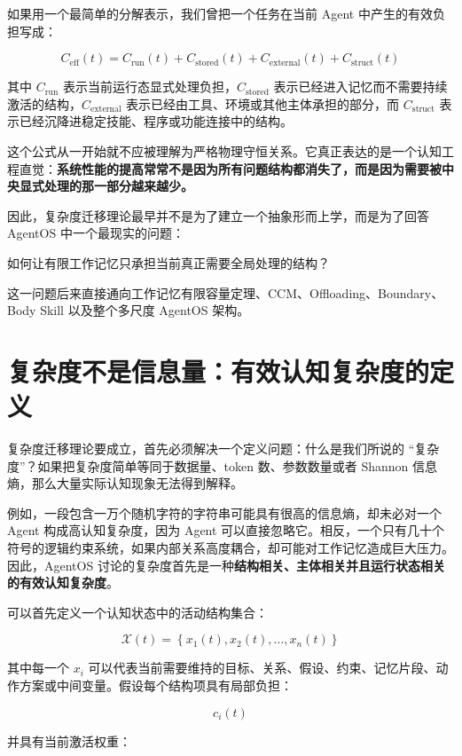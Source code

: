 如果用一个最简单的分解表示，我们曾把一个任务在当前 Agent 中产生的有效负担写成：

\[
C_{\mathrm{eff}}(t)
=
C_{\mathrm{run}}(t)
+
C_{\mathrm{stored}}(t)
+
C_{\mathrm{external}}(t)
+
C_{\mathrm{struct}}(t)
\]

其中 $C_{\mathrm{run}}$ 表示当前运行态显式处理负担，$C_{\mathrm{stored}}$ 表示已经进入记忆而不需要持续激活的结构，$C_{\mathrm{external}}$ 表示已经由工具、环境或其他主体承担的部分，而 $C_{\mathrm{struct}}$ 表示已经沉降进稳定技能、程序或功能连接中的结构。

这个公式从一开始就不应被理解为严格物理守恒关系。它真正表达的是一个认知工程直觉：\textbf{系统性能的提高常常不是因为所有问题结构都消失了，而是因为需要被中央显式处理的那一部分越来越少。}

因此，复杂度迁移理论最早并不是为了建立一个抽象形而上学，而是为了回答 AgentOS 中一个最现实的问题：

\begin{statementbox}
如何让有限工作记忆只承担当前真正需要全局处理的结构？
\end{statementbox}

这一问题后来直接通向工作记忆有限容量定理、CCM、Offloading、Boundary、Body Skill 以及整个多尺度 AgentOS 架构。

\section{复杂度不是信息量：有效认知复杂度的定义}
\label{sec:effective-cognitive-complexity}

复杂度迁移理论要成立，首先必须解决一个定义问题：什么是我们所说的 ``复杂度''？如果把复杂度简单等同于数据量、token 数、参数数量或者 Shannon 信息熵，那么大量实际认知现象无法得到解释。

例如，一段包含一万个随机字符的字符串可能具有很高的信息熵，却未必对一个 Agent 构成高认知复杂度，因为 Agent 可以直接忽略它。相反，一个只有几十个符号的逻辑约束系统，如果内部关系高度耦合，却可能对工作记忆造成巨大压力。因此，AgentOS 讨论的复杂度首先是一种\textbf{结构相关、主体相关并且运行状态相关的有效认知复杂度}。

可以首先定义一个认知状态中的活动结构集合：

\[
\mathcal{X}(t)
=
\left\{
x_1(t),x_2(t),\ldots,x_n(t)
\right\}
\]

其中每一个 $x_i$ 可以代表当前需要维持的目标、关系、假设、约束、记忆片段、动作方案或中间变量。假设每个结构项具有局部负担：

\[
c_i(t)
\]

并具有当前激活权重：

